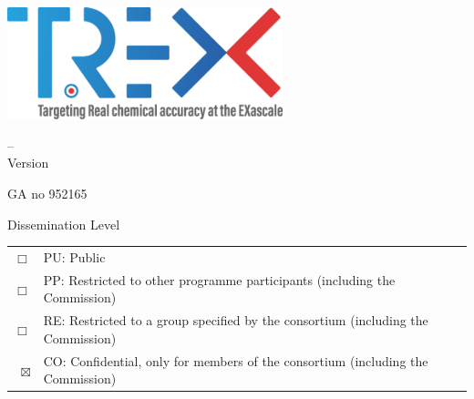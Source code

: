 
\pagestyle{empty}

\begin{center}

  \phantom{} \\  \vspace{2cm}
  \begin{flushright}\SubDate\\\end{flushright}
  \includegraphics[width=0.6\textwidth]{images/trex-logo.png}

  \vspace{2cm}

  {\Huge \DelNumber{} -- \DelTitle}\\\vspace{1cm}
  {Version \DelVersion}

  \vspace*{\fill}

  {\Huge {GA no 952165}}
  \vspace{1cm}


\end{center}
\noindent
Dissemination Level\\[5mm]
\newcommand{\Dissemination}{CO}    %
\begin{tabular*} {\textwidth}{rl}
  $\Box$       & PU: Public  \\      %
  $\Box$       & PP: Restricted to other programme participants (including the Commission) \\
  $\Box$       & RE: Restricted to a group specified by the consortium (including the Commission) \\
  $\boxtimes$      & CO: Confidential, only for members of the consortium (including the Commission)
\end{tabular*} \\





\pagestyle{fancy}
\fancyhf{}


